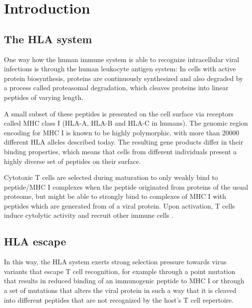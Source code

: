 \documentclass[fleqn,11pt]{SelfArx} %
\affiliation{\textsuperscript{1}\textit{Bioinformatics \& Computational Biophysics, Faculty of Biology, University of Duisburg-Essen, 45117 Essen, Germany}} %
\begin{document}
\flushbottom %

\maketitle %

{
  \hypersetup{linkcolor=black}
  \tableofcontents
}


\section{Introduction}

\subsection{The HLA system}

One way how the human immune system is able to recognize intracellular viral infections is through the human leukocyte antigen system\nolinebreak\cite{Germain1994}: In cells with active protein biosynthesis, proteins are continuously synthesized and also degraded by a process called proteasomal degradation, which cleaves proteins into linear peptides of varying length\nolinebreak\cite{Goldberg2002}.

A small subset of these peptides is presented on the cell surface via receptors called MHC class I (HLA-A, HLA-B and HLA-C in humans). The genomic region encoding for MHC I is known to be highly polymorphic, with more than 20000 different HLA alleles described today\nolinebreak\cite{Robinson2014}. The resulting gene products differ in their binding properties, which means that cells from different individuals present a highly diverse set of peptides on their surface.

Cytotoxic T cells are selected during maturation to only weakly bind to peptide/MHC I complexes when the peptide originated from proteins of the usual proteome, but might be able to strongly bind to complexes of MHC I with peptides which are  generated from of a viral protein\nolinebreak\cite{Murata2007}. Upon activation, T cells induce cytolytic activity and recruit other immune cells \nolinebreak\cite{Harty2000}.

\subsection{HLA escape}
In this way, the HLA system exerts strong selection pressure towards virus variants that escape T cell recognition\nolinebreak\cite{Borrow1997}, for example through a point mutation that results in reduced binding of an immunogenic peptide to MHC I or through a set of mutations that alters the viral protein in such a way that it is cleaved into different peptides that are not recognized by the host's T cell repertoire\nolinebreak\cite{Yewdell2002}.
\end{document}
